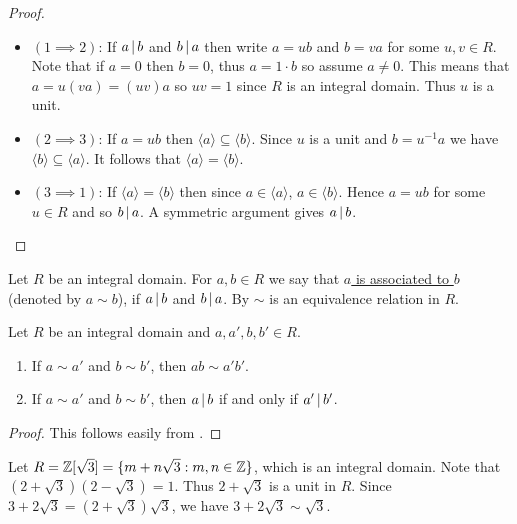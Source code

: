 \documentclass[11pt]{article}
\begin{document}
\begin{proof}\,
    \begin{itemize}
        \item$(1\implies 2)$: If $a\,|\, b$ and $b\,|\, a$ then write $a=ub$ and $b=va$ for some $u,v\in R$. Note that if $a=0$ then $b=0$, thus $a=1\cdot b$ so assume $a\neq0$. This means that $a=u(va)=(uv)a$ so $uv=1$ since $R$ is an integral domain. Thus $u$ is a unit.
        \item$(2\implies 3)$: If $a=ub$ then $\langle a\rangle\subseteq\langle b\rangle$. Since $u$ is a unit and $b=u^{-1}a$ we have $\langle b\rangle\subseteq\langle a \rangle$. It follows that $\langle a\rangle=\langle b\rangle$.
        \item$(3\implies 1)$: If $\langle a\rangle=\langle b\rangle$ then since $a\in\langle a\rangle$, $a\in\langle b\rangle$. Hence $a=ub$ for some $u\in R$ and so $b\,|\, a$. A symmetric argument gives $a\,|\, b$.
    \end{itemize}
\end{proof}

\begin{definition}[Associations]
    Let $R$ be an integral domain. For $a,b\in R$ we say that \ul{$a$ is associated to $b$} (denoted by $a\sim b$), if $a\,|\, b$ and $b\,|\, a$. By  $\sim$ is an equivalence relation in $R$.
\end{definition}

\begin{proposition}
    Let $R$ be an integral domain and $a,a',b,b'\in R$.
    \begin{enumerate}
        \item If $a\sim a'$ and $b\sim b'$, then $ab\sim a'b'$.
        \item If $a\sim a'$ and $b\sim b'$, then $a\,|\, b$ if and only if $a'\,|\, b'$.
    \end{enumerate}
\end{proposition}

\begin{proof}
    This follows easily from .
    
\end{proof}

\begin{example}
    Let $R=\mathbb{Z}[\sqrt{3}]=\{m+n\sqrt{3}:m,n\in\mathbb{Z}\}$, which is an integral domain. Note that $(2+\sqrt{3})(2-\sqrt{3})=1$. Thus $2+\sqrt{3}$ is a unit in $R$. Since $3+2\sqrt{3}=(2+\sqrt{3})\sqrt{3}$, we have $3+2\sqrt{3}\sim\sqrt{3}$.
\end{example}
\end{document}
